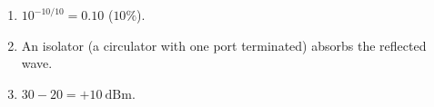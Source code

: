 \begin{enumerate}[leftmargin=1.6em,itemsep=2pt]
\item $10^{-10/10} = 0.10$ ($10\%$).
\item An isolator (a circulator with one port terminated) absorbs the reflected wave.
\item $30 - 20 = +10\ \text{dBm}$.
\end{enumerate}
